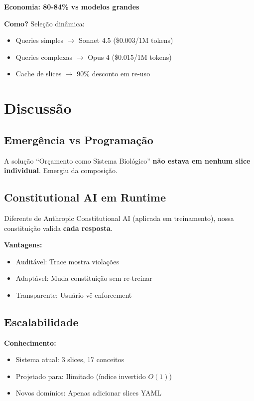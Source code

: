 \documentclass[11pt]{article}
\begin{document}
\textbf{Economia: 80-84\% vs modelos grandes}

\textbf{Como?} Seleção dinâmica:
\begin{itemize}
    \item Queries simples $\rightarrow$ Sonnet 4.5 (\$0.003/1M tokens)
    \item Queries complexas $\rightarrow$ Opus 4 (\$0.015/1M tokens)
    \item Cache de slices $\rightarrow$ 90\% desconto em re-uso
\end{itemize}

\section{Discussão}

\subsection{Emergência vs Programação}

A solução ``Orçamento como Sistema Biológico'' \textbf{não estava em nenhum slice individual}. Emergiu da composição.

\subsection{Constitutional AI em Runtime}

Diferente de Anthropic Constitutional AI (aplicada em treinamento), nossa constituição valida \textbf{cada resposta}.

\textbf{Vantagens:}
\begin{itemize}
    \item Auditável: Trace mostra violações
    \item Adaptável: Muda constituição sem re-treinar
    \item Transparente: Usuário vê enforcement
\end{itemize}

\subsection{Escalabilidade}

\textbf{Conhecimento:}
\begin{itemize}
    \item Sistema atual: 3 slices, 17 conceitos
    \item Projetado para: Ilimitado (índice invertido $O(1)$)
    \item Novos domínios: Apenas adicionar slices YAML
\end{itemize}
\end{document}
